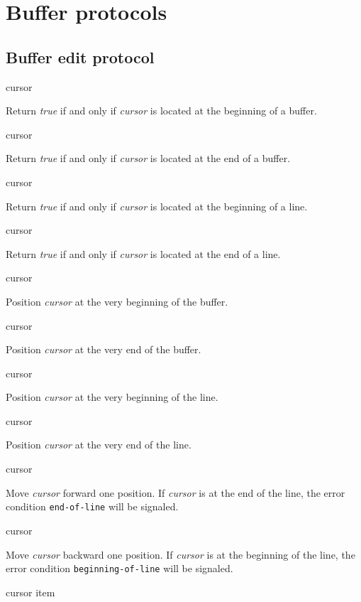 \chapter{Buffer protocols}
\label{chap-buffer-protocols}

\section{Buffer edit protocol}

 {cursor}

Return \textit{true} if and only if \textit{cursor} is located at the
beginning of a buffer.

 {cursor}

Return \textit{true} if and only if \textit{cursor} is located at the
end of a buffer.

 {cursor}

Return \textit{true} if and only if \textit{cursor} is located at the
beginning of a line.

 {cursor}

Return \textit{true} if and only if \textit{cursor} is located at the
end of a line.

 {cursor}

Position \textit{cursor} at the very beginning of the buffer.

 {cursor}

Position \textit{cursor} at the very end of the buffer.

 {cursor}

Position \textit{cursor} at the very beginning of the line.

 {cursor}

Position \textit{cursor} at the very end of the line.

 {cursor}

Move \textit{cursor} forward one position.  If \emph{cursor} is at the
end of the line, the error condition \texttt{end-of-line} will be
signaled.

 {cursor}

Move \textit{cursor} backward one position.  If \emph{cursor} is at
the beginning of the line, the error condition
\texttt{beginning-of-line} will be signaled.

 {cursor item}

